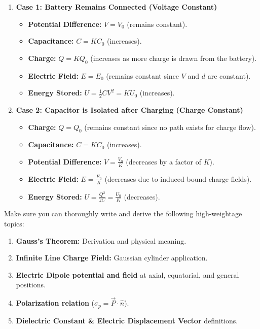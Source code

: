 \documentclass[11pt,a4paper]{article}
\begin{document}
\begin{enumerate}
    \item \textbf{Case 1: Battery Remains Connected (Voltage Constant)}
    \begin{itemize}
        \item \textbf{Potential Difference:} $V = V_0$ (remains constant).
        \item \textbf{Capacitance:} $C = K C_0$ (increases).
        \item \textbf{Charge:} $Q = K Q_0$ (increases as more charge is drawn from the battery).
        \item \textbf{Electric Field:} $E = E_0$ (remains constant since $V$ and $d$ are constant).
        \item \textbf{Energy Stored:} $U = \frac{1}{2} C V^2 = K U_0$ (increases).
    \end{itemize}
    
    \item \textbf{Case 2: Capacitor is Isolated after Charging (Charge Constant)}
    \begin{itemize}
        \item \textbf{Charge:} $Q = Q_0$ (remains constant since no path exists for charge flow).
        \item \textbf{Capacitance:} $C = K C_0$ (increases).
        \item \textbf{Potential Difference:} $V = \frac{V_0}{K}$ (decreases by a factor of $K$).
        \item \textbf{Electric Field:} $E = \frac{E_0}{K}$ (decreases due to induced bound charge fields).
        \item \textbf{Energy Stored:} $U = \frac{Q^2}{2C} = \frac{U_0}{K}$ (decreases).
    \end{itemize}
\end{enumerate}

\newpage
\begin{prioritybox}
    Make sure you can thoroughly write and derive the following high-weightage topics:
    \begin{enumerate}[label=\textbf{\arabic*.}]
        \item \textbf{Gauss's Theorem:} Derivation and physical meaning.
        \item \textbf{Infinite Line Charge Field:} Gaussian cylinder application.
        \item \textbf{Electric Dipole potential and field} at axial, equatorial, and general positions.
        \item \textbf{Polarization relation} ($\sigma_p = \vec{P} \cdot \hat{n}$).
        \item \textbf{Dielectric Constant \& Electric Displacement Vector} definitions.
    \end{enumerate}
\end{prioritybox}
\end{document}
